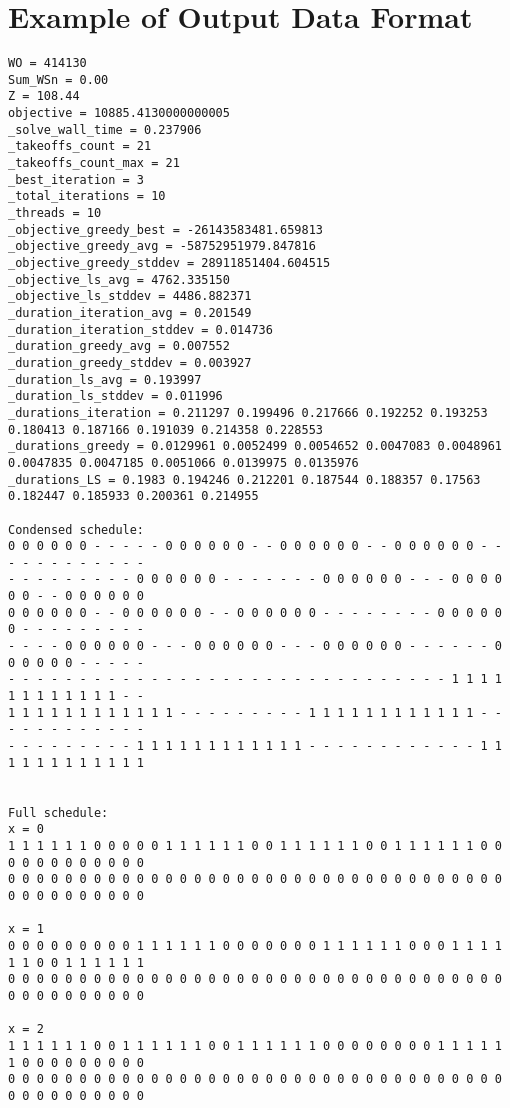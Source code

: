 \chapter{Example of Output Data Format}\label{appx:output-file}

\lstset{style=appendix-file-style}
\begin{lstlisting}
WO = 414130
Sum_WSn = 0.00
Z = 108.44
objective = 10885.4130000000005
_solve_wall_time = 0.237906
_takeoffs_count = 21
_takeoffs_count_max = 21
_best_iteration = 3
_total_iterations = 10
_threads = 10
_objective_greedy_best = -26143583481.659813
_objective_greedy_avg = -58752951979.847816
_objective_greedy_stddev = 28911851404.604515
_objective_ls_avg = 4762.335150
_objective_ls_stddev = 4486.882371
_duration_iteration_avg = 0.201549
_duration_iteration_stddev = 0.014736
_duration_greedy_avg = 0.007552
_duration_greedy_stddev = 0.003927
_duration_ls_avg = 0.193997
_duration_ls_stddev = 0.011996
_durations_iteration = 0.211297 0.199496 0.217666 0.192252 0.193253 0.180413 0.187166 0.191039 0.214358 0.228553 
_durations_greedy = 0.0129961 0.0052499 0.0054652 0.0047083 0.0048961 0.0047835 0.0047185 0.0051066 0.0139975 0.0135976 
_durations_LS = 0.1983 0.194246 0.212201 0.187544 0.188357 0.17563 0.182447 0.185933 0.200361 0.214955 

Condensed schedule:
0 0 0 0 0 0 - - - - - 0 0 0 0 0 0 - - 0 0 0 0 0 0 - - 0 0 0 0 0 0 - - - - - - - - - - - - 
- - - - - - - - - 0 0 0 0 0 0 - - - - - - - 0 0 0 0 0 0 - - - 0 0 0 0 0 0 - - 0 0 0 0 0 0 
0 0 0 0 0 0 - - 0 0 0 0 0 0 - - 0 0 0 0 0 0 - - - - - - - - 0 0 0 0 0 0 - - - - - - - - - 
- - - - 0 0 0 0 0 0 - - - 0 0 0 0 0 0 - - - 0 0 0 0 0 0 - - - - - - 0 0 0 0 0 0 - - - - - 
- - - - - - - - - - - - - - - - - - - - - - - - - - - - - - - 1 1 1 1 1 1 1 1 1 1 1 1 - - 
1 1 1 1 1 1 1 1 1 1 1 1 - - - - - - - - - 1 1 1 1 1 1 1 1 1 1 1 1 - - - - - - - - - - - - 
- - - - - - - - - 1 1 1 1 1 1 1 1 1 1 1 1 - - - - - - - - - - - - 1 1 1 1 1 1 1 1 1 1 1 1 


Full schedule:
x = 0
1 1 1 1 1 1 0 0 0 0 0 1 1 1 1 1 1 0 0 1 1 1 1 1 1 0 0 1 1 1 1 1 1 0 0 0 0 0 0 0 0 0 0 0 0 
0 0 0 0 0 0 0 0 0 0 0 0 0 0 0 0 0 0 0 0 0 0 0 0 0 0 0 0 0 0 0 0 0 0 0 0 0 0 0 0 0 0 0 0 0 

x = 1
0 0 0 0 0 0 0 0 0 1 1 1 1 1 1 0 0 0 0 0 0 0 1 1 1 1 1 1 0 0 0 1 1 1 1 1 1 0 0 1 1 1 1 1 1 
0 0 0 0 0 0 0 0 0 0 0 0 0 0 0 0 0 0 0 0 0 0 0 0 0 0 0 0 0 0 0 0 0 0 0 0 0 0 0 0 0 0 0 0 0 

x = 2
1 1 1 1 1 1 0 0 1 1 1 1 1 1 0 0 1 1 1 1 1 1 0 0 0 0 0 0 0 0 1 1 1 1 1 1 0 0 0 0 0 0 0 0 0 
0 0 0 0 0 0 0 0 0 0 0 0 0 0 0 0 0 0 0 0 0 0 0 0 0 0 0 0 0 0 0 0 0 0 0 0 0 0 0 0 0 0 0 0 0 


\end{lstlisting}
